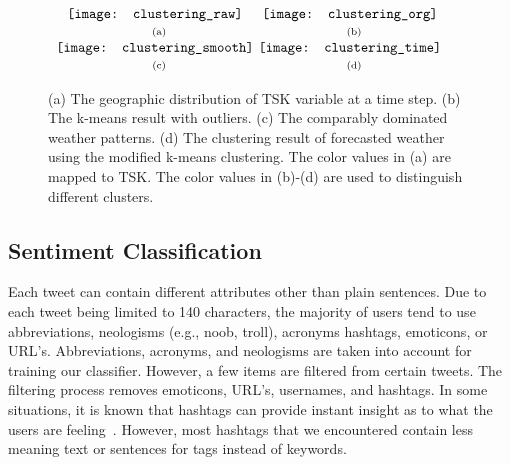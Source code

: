 \begin{figure}[t]
\begin{center}
$\begin{array}{c@{\hspace{0.01\linewidth}}c}
\texttt{[image: clustering\_raw]} &
\texttt{[image: clustering\_org]}
\\
\mbox{\small{(a)}} & \mbox{\small{(b)}}
\\
\texttt{[image: clustering\_smooth]} &
\texttt{[image: clustering\_time]}
\\
\mbox{\small{(c)}} & \mbox{\small{(d)}}
\end{array}$
\end{center}
\vspace{-.1in}
\caption{(a) The geographic distribution of TSK variable at a time step. (b) The k-means result with outliers. (c) The comparably dominated weather patterns. (d) The clustering result of forecasted weather using the modified k-means clustering. The color values in (a) are mapped to TSK. The color values in (b)-(d) are used to distinguish different clusters.}
\label{fig:clustering}
\end{figure}

\subsection{Sentiment Classification}
\label{sec:senti}

Each tweet can contain different attributes other than plain sentences. Due to each tweet being limited to 140 characters, the majority of users tend to use abbreviations, neologisms (e.g., noob, troll), acronyms hashtags, emoticons, or URL's. Abbreviations, acronyms, and neologisms are taken into account for training our classifier. However, a few items are filtered from certain tweets. The filtering process removes emoticons, URL's, usernames, and hashtags. In some situations, it is known that hashtags can provide instant insight as to what the users are feeling~\cite{keller2005warm}. However, most hashtags that we encountered contain less meaning text or sentences for tags instead of keywords.

